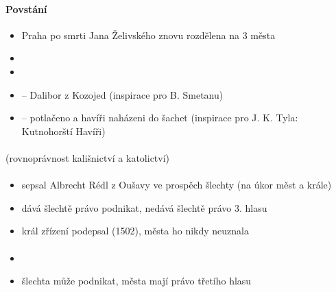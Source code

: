 \paragraph{Povstání}
\begin{itemize}
\item Praha po smrti Jana Želivského znovu rozdělena na 3 města
\item {}
\item {}
\item {} -- Dalibor z Kozojed (inspirace pro B. Smetanu)
\item {} -- potlačeno a havíři naházeni do šachet (inspirace pro J. K. Tyla: Kutnohorští Havíři)
\end{itemize}

\paragraph{} (rovnoprávnost kališnictví a katolictví)

\paragraph{}
\begin{itemize}
\item sepsal Albrecht Rédl z Oušavy ve prospěch šlechty (na úkor měst a krále)
\item dává šlechtě právo podnikat, nedává šlechtě právo 3. hlasu
\item král zřízení podepsal (1502), města ho nikdy neuznala
\end{itemize}

\paragraph{}
\begin{itemize}
\item[\ra] 
\item šlechta může podnikat, města mají právo třetího hlasu
\end{itemize}


